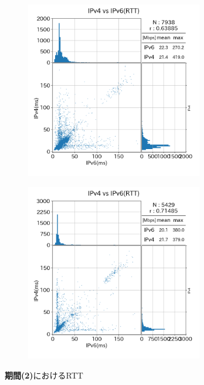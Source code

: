 \begin{figure}
\begin{center}
\begin{minipage}[t]{0.48\textwidth}
\begin{subfigure}[b]{\textwidth}
                \label{new_IPv4aaS_rtt}
            \end{subfigure}
            \begin{subfigure}[b]{\textwidth}
                \centering
                \includegraphics[width=0.85\textwidth]{fig/new_mix_rtt.png}
                \label{new_mix_rtt}
            \end{subfigure}
            \begin{subfigure}[b]{\textwidth}
                \centering
                \includegraphics[width=0.85\textwidth]{fig/new_PPPoE_rtt.png}
                \label{new_PPPoE_rtt}
            \end{subfigure}
            \caption{{\bf 期間(2)}におけるRTT}
            \label{fig:new_connect_rtt}
        \end{minipage}
    \end{center}
\end{figure}
